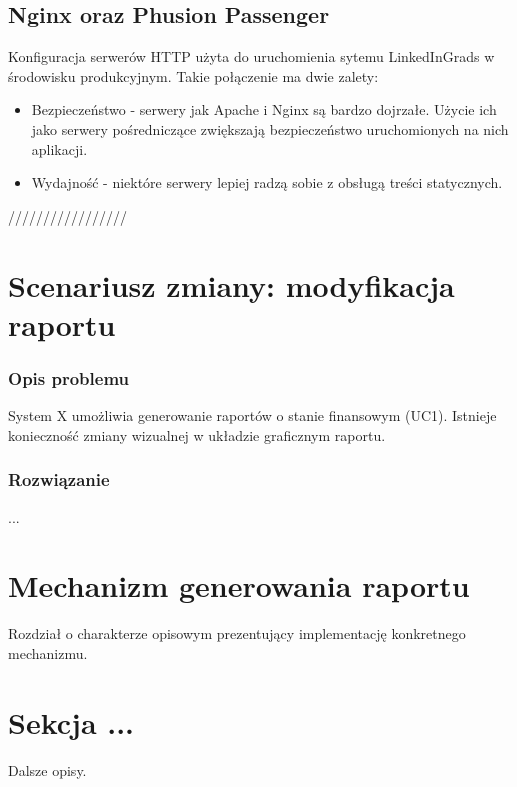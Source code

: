 \subsection{Nginx oraz Phusion Passenger}

Konfiguracja serwerów HTTP użyta do uruchomienia sytemu LinkedInGrads w środowisku produkcyjnym. Takie połączenie ma dwie zalety:

\begin{itemize}
\item Bezpieczeństwo - serwery jak Apache i Nginx są bardzo dojrzałe. Użycie ich jako serwery pośredniczące zwiększają bezpieczeństwo uruchomionych na nich aplikacji.
\item Wydajność - niektóre serwery lepiej radzą sobie z obsługą treści statycznych.
\end{itemize}

/////////////////
\section{Scenariusz zmiany: modyfikacja raportu}
\label{Chapter62}

\subsubsection{Opis problemu}
System X umożliwia generowanie raportów o stanie finansowym (UC1). Istnieje konieczność zmiany wizualnej w układzie graficznym raportu.

\subsubsection{Rozwiązanie}
...

\section{Mechanizm generowania raportu}
\label{Chapter63}

Rozdział o charakterze opisowym prezentujący implementację konkretnego mechanizmu.

\section{Sekcja ...}
\label{Chapter64}

Dalsze opisy.